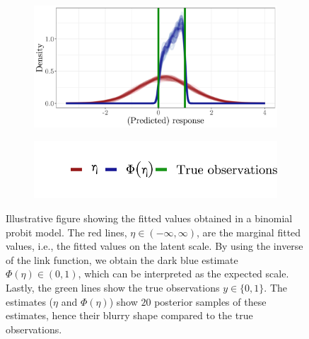 \begin{figure}
    \centering
    \begin{subfigure}{0.8\textwidth}
    \includegraphics[width=\textwidth]{figures/illustration_probit_scales_fitted_values.pdf}
    \end{subfigure}
    \begin{subfigure}[b]{0.4\textwidth}
        \includegraphics[width=\textwidth]{figures/illustration_probit_scales_fitted_values_legend.pdf}
    \end{subfigure}
    \caption[Illustration of fitted values for a probit animal model]{Illustrative figure showing the fitted values obtained in a binomial probit model. The red lines, $\eta\in(-\infty, \infty)$, are the marginal fitted values, i.e., the fitted values on the latent scale. By using the inverse of the link function, we obtain the dark blue estimate $\Phi(\eta)\in(0,1)$, which can be interpreted as the expected scale. Lastly, the green lines show the true observations $y\in\{0,1\}$. The estimates ($\eta$ and $\Phi(\eta)$) show $20$ posterior samples of these estimates, hence their blurry shape compared to the true observations.} \label{fig:theory:illustration-probit-fitted-values}
\end{figure}

